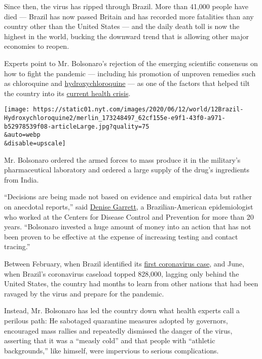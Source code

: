 Since then, the virus has ripped through Brazil. More than 41,000 people
have died --- Brazil has now passed Britain and has recorded more
fatalities than any country other than the United States --- and the
daily death toll is now the highest in the world, bucking the downward
trend that is allowing other major economies to reopen.

Experts point to Mr. Bolsonaro's rejection of the emerging scientific
consensus on how to fight the pandemic --- including his promotion of
unproven remedies such as chloroquine and
\href{https://www.nytimes.com/2020/06/20/health/hydroxychloroquine-coronavirus-trial.html}{hydroxychloroquine}
--- as one of the factors that helped tilt the country into its
\href{https://www.nytimes.com/2020/05/12/world/americas/latin-america-virus-death.html}{current
health crisis}.

\texttt{[image: https://static01.nyt.com/images/2020/06/12/world/12Brazil-Hydroxychloroquine2/merlin\_173248497\_62cf155e-e9f1-43f0-a971-b52978539f08-articleLarge.jpg?quality=75\\\&auto=webp\\\&disable=upscale]}

Mr. Bolsonaro ordered the armed forces to mass produce it in the
military's pharmaceutical laboratory and ordered a large supply of the
drug's ingredients from India.

``Decisions are being made not based on evidence and empirical data but
rather on anecdotal reports,'' said
\href{https://www.sabin.org/updates/pressreleases/dr-denise-garrett-joins-sabin-director-coalition-against-typhoid}{Denise
Garrett}, a Brazilian-American epidemiologist who worked at the Centers
for Disease Control and Prevention for more than 20 years. ``Bolsonaro
invested a huge amount of money into an action that has not been proven
to be effective at the expense of increasing testing and contact
tracing.''

Between February, when Brazil identified its
\href{https://www.nytimes.com/2020/02/26/world/americas/brazil-italy-coronavirus.html}{first
coronavirus case}, and June, when Brazil's coronavirus caseload topped
828,000, lagging only behind the United States, the country had months
to learn from other nations that had been ravaged by the virus and
prepare for the pandemic.

Instead, Mr. Bolsonaro has led the country down what health experts call
a perilous path: He sabotaged quarantine measures adopted by governors,
encouraged mass rallies and repeatedly dismissed the danger of the
virus, asserting that it was a ``measly cold'' and that people with
``athletic backgrounds,'' like himself, were impervious to serious
complications.

